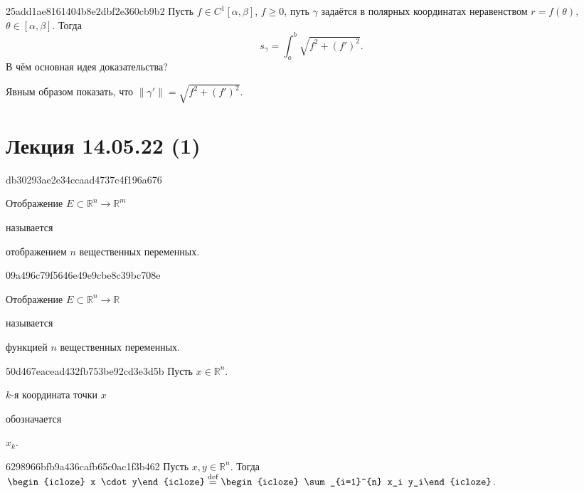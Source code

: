\begin{note}{25add1ae8161404b8e2dbf2e360cb9b2}
    Пусть \({ f \in C^{1}[\alpha, \beta] }\), \({ f \geqslant 0 }\), путь \({ \gamma }\) задаётся в полярных координатах неравенством \({ r = f(\theta) }\),\: \({ \theta \in [\alpha, \beta] }\). Тогда
    \[
        s_\gamma = \int_{a}^{b} \sqrt{f^2 + (f')^2}.
    \]
    В чём основная идея доказательства?

    \begin{cloze}{1}
        Явным образом показать, что \({ \left\lVert \gamma' \right\rVert = \sqrt{f^2 + (f')^2} }\).
    \end{cloze}
\end{note}

\section{Лекция 14.05.22 (1)}
\begin{note}{db30293ae2e34ccaad4737c4f196a676}
    \begin{icloze}{2}Отображение \({ E \subset \mathbb R^{n} \to \mathbb R^{m} }\)\end{icloze} называется \begin{icloze}{1}отображением \({ n }\) вещественных переменных.\end{icloze}
\end{note}

\begin{note}{09a496c79f5646e49e9cbe8c39bc708e}
    \begin{icloze}{2}Отображение \({ E \subset \mathbb R^{n} \to \mathbb R }\)\end{icloze} называется \begin{icloze}{1}функцией \({ n }\) вещественных переменных.\end{icloze}
\end{note}

\begin{note}{50d467eacead432fb753be92cd3e3d5b}
    Пусть \({ x \in \mathbb R^{n} }\). \begin{icloze}{2}\({ k }\)-я координата точки \({ x }\)\end{icloze} обозначается \begin{icloze}{1}\({ x_k }\).\end{icloze}
\end{note}

\begin{note}{6298966bfb9a436cafb65c0ac1f3b462}
    Пусть \({ x, y \in \mathbb R^{n} }\).
    Тогда \({ \displaystyle \begin{icloze}{2}x \cdot y\end{icloze} \overset{\text{def}}= \begin{icloze}{1}\sum_{i=1}^{n} x_i y_i\end{icloze} }\).
\end{note}

